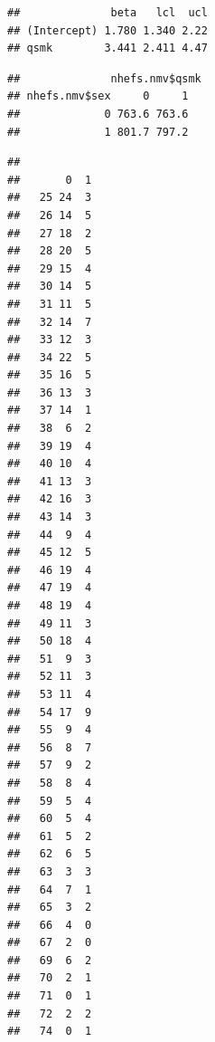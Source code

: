 \documentclass[
  10pt,
]{book}
\newenvironment{Shaded}{\begin{snugshade}}{\end{snugshade}}
\newcommand{\CommentTok}[1]{\textcolor[rgb]{0.56,0.35,0.01}{\textit{#1}}}
\newcommand{\DecValTok}[1]{\textcolor[rgb]{0.00,0.00,0.81}{#1}}
\newcommand{\FunctionTok}[1]{\textcolor[rgb]{0.00,0.00,0.00}{#1}}
\newcommand{\NormalTok}[1]{#1}
\newcommand{\SpecialCharTok}[1]{\textcolor[rgb]{0.00,0.00,0.00}{#1}}
\begin{document}
\begin{verbatim}
##              beta   lcl  ucl
## (Intercept) 1.780 1.340 2.22
## qsmk        3.441 2.411 4.47
\end{verbatim}

\begin{Shaded}
\end{Shaded}

\begin{verbatim}
##              nhefs.nmv$qsmk
## nhefs.nmv$sex     0     1
##             0 763.6 763.6
##             1 801.7 797.2
\end{verbatim}

\begin{Shaded}
\end{Shaded}

\begin{verbatim}
##     
##       0  1
##   25 24  3
##   26 14  5
##   27 18  2
##   28 20  5
##   29 15  4
##   30 14  5
##   31 11  5
##   32 14  7
##   33 12  3
##   34 22  5
##   35 16  5
##   36 13  3
##   37 14  1
##   38  6  2
##   39 19  4
##   40 10  4
##   41 13  3
##   42 16  3
##   43 14  3
##   44  9  4
##   45 12  5
##   46 19  4
##   47 19  4
##   48 19  4
##   49 11  3
##   50 18  4
##   51  9  3
##   52 11  3
##   53 11  4
##   54 17  9
##   55  9  4
##   56  8  7
##   57  9  2
##   58  8  4
##   59  5  4
##   60  5  4
##   61  5  2
##   62  6  5
##   63  3  3
##   64  7  1
##   65  3  2
##   66  4  0
##   67  2  0
##   69  6  2
##   70  2  1
##   71  0  1
##   72  2  2
##   74  0  1
\end{verbatim}
\end{document}

